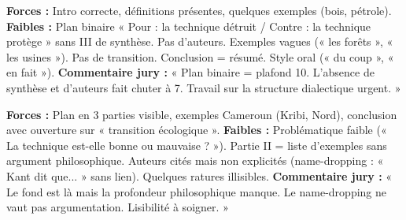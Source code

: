 \documentclass[11pt]{article}
\begin{document}
\begin{exemplebox}
\textbf{Forces :} Intro correcte, définitions présentes, quelques exemples (bois, pétrole).
\textbf{Faibles :} Plan binaire « Pour : la technique détruit / Contre : la technique protège » sans III de synthèse. Pas d'auteurs. Exemples vagues (« les forêts », « les usines »). Pas de transition. Conclusion = résumé. Style oral (« du coup », « en fait »).
\textbf{Commentaire jury :} « Plan binaire = plafond 10. L'absence de synthèse et d'auteurs fait chuter à 7. Travail sur la structure dialectique urgent. »
\end{exemplebox}

\begin{exemplebox}
\textbf{Forces :} Plan en 3 parties visible, exemples Cameroun (Kribi, Nord), conclusion avec ouverture sur « transition écologique ».
\textbf{Faibles :} Problématique faible (« La technique est-elle bonne ou mauvaise ? »). Partie II = liste d'exemples sans argument philosophique. Auteurs cités mais non explicités (name-dropping : « Kant dit que... » sans lien). Quelques ratures illisibles.
\textbf{Commentaire jury :} « Le fond est là mais la profondeur philosophique manque. Le name-dropping ne vaut pas argumentation. Lisibilité à soigner. »
\end{exemplebox}
\end{document}
